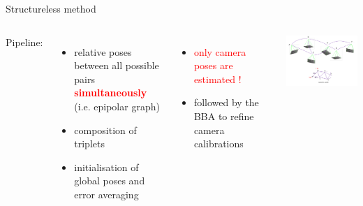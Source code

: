 \documentclass{beamer}
\begin{document}
		\begin{frame}{Structureless method}
	    
		\begin{columns}
			\setlength{\unitlength}{1cm}
			\hspace{1cm}
%
		Pipeline:
		\begin{itemize} 
			\item \footnotesize relative poses between all possible pairs \textcolor{red}{\textbf{simultaneously}}\\ (i.e. epipolar graph) 
			\item \footnotesize composition of triplets
			\item \footnotesize initialisation of global poses and error averaging
		\end{itemize}
%  
		\vspace{0.5cm}
    	\footnotesize 
		\begin{itemize}
			\item<2-> \textcolor{red}{only camera poses are estimated !}
			\item<2-> followed by the BBA  to refine camera calibrations
		\end{itemize}

		\setlength{\unitlength}{1cm}
		\includegraphics[width=7.5cm]{images/graph.pdf} 

		\end{columns}
		 
		\end{frame}	
		
\end{document}
